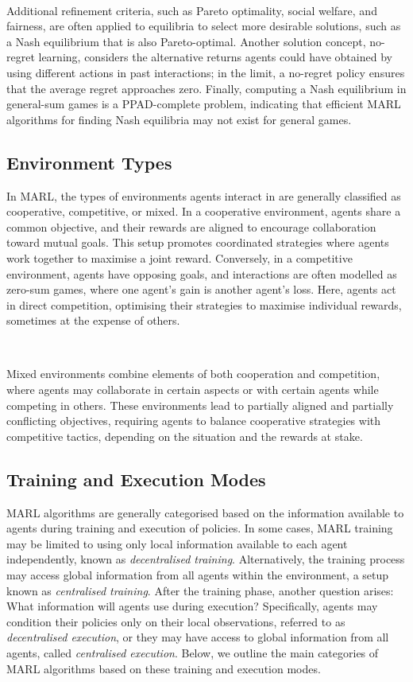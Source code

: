 \documentclass{article}
\begin{document}
\

Additional refinement criteria, such as Pareto optimality, social welfare, and fairness, are often applied to equilibria to select more desirable solutions, such as a Nash equilibrium that is also Pareto-optimal. \citep{albrecht2024marl} Another solution concept, no-regret learning, considers the alternative returns agents could have obtained by using different actions in past interactions; in the limit, a no-regret policy ensures that the average regret approaches zero. Finally, computing a Nash equilibrium in general-sum games is a PPAD-complete problem, indicating that efficient MARL algorithms for finding Nash equilibria may not exist for general games.


\subsection{Environment Types}

In MARL, the types of environments agents interact in are generally classified as cooperative, competitive, or mixed. In a cooperative environment, agents share a common objective, and their rewards are aligned to encourage collaboration toward mutual goals. This setup promotes coordinated strategies where agents work together to maximise a joint reward. Conversely, in a competitive environment, agents have opposing goals, and interactions are often modelled as zero-sum games, where one agent’s gain is another agent’s loss. Here, agents act in direct competition, optimising their strategies to maximise individual rewards, sometimes at the expense of others. 

\

Mixed environments combine elements of both cooperation and competition, where agents may collaborate in certain aspects or with certain agents while competing in others. These environments lead to partially aligned and partially conflicting objectives, requiring agents to balance cooperative strategies with competitive tactics, depending on the situation and the rewards at stake.


\subsection{Training and Execution Modes}

MARL algorithms are generally categorised based on the information available to agents during training and execution of policies. In some cases, MARL training may be limited to using only local information available to each agent independently, known as \textit{decentralised training}. Alternatively, the training process may access global information from all agents within the environment, a setup known as \textit{centralised training}. After the training phase, another question arises: What information will agents use during execution? Specifically, agents may condition their policies only on their local observations, referred to as \textit{decentralised execution}, or they may have access to global information from all agents, called \textit{centralised execution}. Below, we outline the main categories of MARL algorithms based on these training and execution modes.
\end{document}

